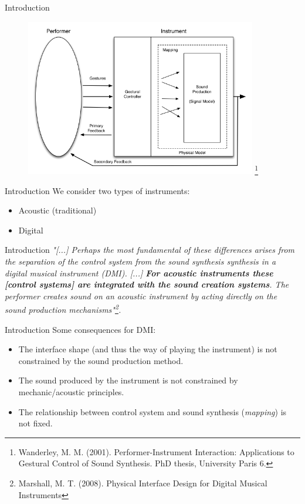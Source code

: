 \documentclass{beamer}
\newcommand\blfootnote[1]{%
  \begingroup
  \renewcommand\thefootnote{}\footnote{#1}%
  \addtocounter{footnote}{-1}%
  \endgroup
}
\begin{document}
\begin{frame}{Introduction}
    \begin{figure}[h]
        \includegraphics[width=0.9\textwidth]{instrument_scheme.png}\blfootnote{Wanderley, M. M. (2001). Performer-Instrument Interaction: Applications to Gestural Control of Sound Synthesis. PhD thesis, University Paris 6.}
    \end{figure}
\end{frame}

\begin{frame}{Introduction}
    We consider two types of instruments:
    \begin{itemize}
        \item Acoustic (traditional)
        \item Digital
    \end{itemize}
\end{frame}

\begin{frame}{Introduction}
    \textit{    "[...] Perhaps the most fundamental of these differences arises from the separation of the control system from the sound synthesis synthesis in a digital musical instrument (DMI). [...] \textbf{For acoustic instruments these [control systems] are integrated with the sound creation systems}. The performer creates sound on an acoustic instrument by acting directly on the sound production mechanisms"\footnote{Marshall, M. T. (2008). Physical Interface Design for Digital Musical Instruments}.}
\end{frame}

\begin{frame}{Introduction}
    Some consequences for DMI:
    \begin{itemize}
        \item The interface shape (and thus the way of playing the instrument) is not constrained by the sound production method. 
        \item The sound produced by the instrument is not constrained by mechanic/acoustic principles.
        \item The relationship between control system and sound synthesis (\textit{mapping}) is not fixed. 
    \end{itemize}
\end{frame}
\end{document}

